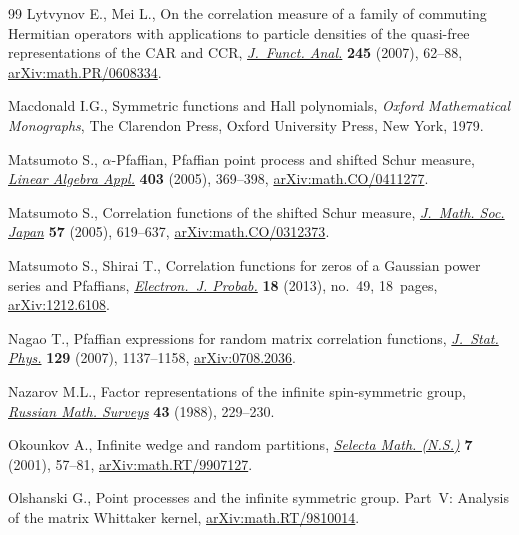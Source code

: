 \documentclass[pdftex]{sigma}
\numberwithin{equation}{section}
\begin{document}
\begin{thebibliography}{99}
Lytvynov E., Mei L., On the correlation measure of a family of commuting
 {H}ermitian operators with applications to particle densities of the
 quasi-free representations of the {CAR} and {CCR}, \href{https://doi.org/10.1016/j.jfa.2006.12.017}{\textit{J.~Funct. Anal.}}
 \textbf{245} (2007), 62--88, \href{https://arxiv.org/abs/math.PR/0608334}{arXiv:math.PR/0608334}.

Macdonald I.G., Symmetric functions and {H}all polynomials, \textit{Oxford Mathematical
 Monographs}, The Clarendon Press, Oxford University Press, New York, 1979.

Matsumoto S., {$\alpha$}-{P}faffian, {P}faffian point process and shifted
 {S}chur measure, \href{https://doi.org/10.1016/j.laa.2005.02.005}{\textit{Linear Algebra Appl.}} \textbf{403} (2005), 369--398,
 \href{https://arxiv.org/abs/math.CO/0411277}{arXiv:math.CO/0411277}.

Matsumoto S., Correlation functions of the shifted {S}chur measure,
 \href{https://doi.org/10.2969/jmsj/1158241925}{\textit{J.~Math. Soc. Japan}} \textbf{57} (2005), 619--637,
 \href{https://arxiv.org/abs/math.CO/0312373}{arXiv:math.CO/0312373}.

Matsumoto S., Shirai T., Correlation functions for zeros of a {G}aussian power
 series and {P}faffians, \href{https://doi.org/10.1214/EJP.v18-2545}{\textit{Electron.~J. Probab.}} \textbf{18} (2013),
 no.~49, 18~pages, \href{https://arxiv.org/abs/1212.6108}{arXiv:1212.6108}.

Nagao T., Pfaffian expressions for random matrix correlation functions,
 \href{https://doi.org/10.1007/s10955-007-9415-9}{\textit{J.~Stat. Phys.}} \textbf{129} (2007), 1137--1158, \href{https://arxiv.org/abs/0708.2036}{arXiv:0708.2036}.

Nazarov M.L., Factor representations of the infinite spin-symmetric group,
 \href{https://doi.org/10.1070/RM1988v043n04ABEH001912}{\textit{Russian Math. Surveys}} \textbf{43} (1988), 229--230.

Okounkov A., Infinite wedge and random partitions, \href{https://doi.org/10.1007/PL00001398}{\textit{Selecta Math.
 (N.S.)}} \textbf{7} (2001), 57--81, \href{https://arxiv.org/abs/math.RT/9907127}{arXiv:math.RT/9907127}.

Olshanski G., Point processes and the infinite symmetric group. Part~V:
 Analysis of the matrix Whittaker kernel, \href{https://arxiv.org/abs/math.RT/9810014}{arXiv:math.RT/9810014}.


\end{thebibliography}
\end{document}
